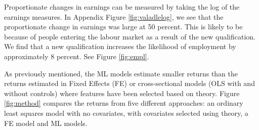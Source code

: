 \documentclass[12pt, a4paper]{article}
\begin{document}
%

Proportionate changes in earnings can be measured by taking the log of the earnings measures. In Appendix Figure \ref{fig:valadlelog}, we see that the proportionate change in earnings was large at 50 percent. This is likely to be because of people entering the labour market as a result of the new qualification. We find that a new qualification increases the likelihood of employment by approximately 8 percent. See Figure \ref{fig:empl}.

As previously mentioned, the ML models estimate smaller returns than the returns estimated in Fixed Effects (FE) or cross-sectional models (OLS with and without controls) where features have been selected based on theory. Figure \ref{fig:method} compares the returns from five different approaches: an ordinary least squares model with no covariates, with covariates selected using theory, a FE model and ML models.

%
\end{document}
